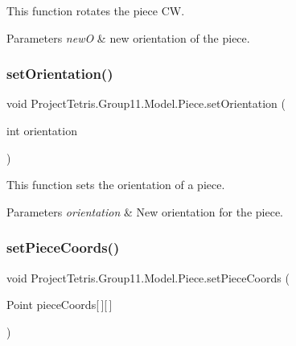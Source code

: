 This function rotates the piece CW. 


\begin{DoxyParams}{Parameters}
{\em newO} & new orientation of the piece. \\
\hline
\end{DoxyParams}
\hypertarget{class_project_tetris_1_1_group11_1_1_model_1_1_piece_a84cf70c609e13d3a31f7c3815ddff827}{}\label{class_project_tetris_1_1_group11_1_1_model_1_1_piece_a84cf70c609e13d3a31f7c3815ddff827} 
\subsubsection{\texorpdfstring{set\+Orientation()}{setOrientation()}}
{\footnotesize\ttfamily void Project\+Tetris.\+Group11.\+Model.\+Piece.\+set\+Orientation (\begin{DoxyParamCaption}\item[{int}]{orientation }\end{DoxyParamCaption})}



This function sets the orientation of a piece. 


\begin{DoxyParams}{Parameters}
{\em orientation} & New orientation for the piece. \\
\hline
\end{DoxyParams}
\hypertarget{class_project_tetris_1_1_group11_1_1_model_1_1_piece_aba9188db14387a600e902dadd2d20332}{}\label{class_project_tetris_1_1_group11_1_1_model_1_1_piece_aba9188db14387a600e902dadd2d20332} 
\subsubsection{\texorpdfstring{set\+Piece\+Coords()}{setPieceCoords()}}
{\footnotesize\ttfamily void Project\+Tetris.\+Group11.\+Model.\+Piece.\+set\+Piece\+Coords (\begin{DoxyParamCaption}\item[{Point}]{piece\+Coords\mbox{[}$\,$\mbox{]}\mbox{[}$\,$\mbox{]} }\end{DoxyParamCaption})}



